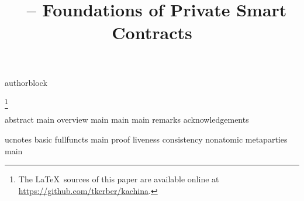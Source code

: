 \usepackage{packages}
\usepackage{contract}
\usepackage{notation}
\graphicspath{{fig/}}
\makeatletter
\newif\iffull\fulltrue
\makeatother
{authorblock}
\title{\kachina\ -- Foundations of Private Smart Contracts}


\maketitle
\todosum

\begingroup
\renewcommand\thefootnote{}%
\footnote{The \LaTeX\ sources of this paper are available online at \url{https://github.com/tkerber/kachina}.}%
\addtocounter{footnote}{-1}%
\endgroup
{abstract}
{main}
{overview}
{main}
{main}
{main}
{remarks}
{acknowledgements}

{}


\iffull
\startappendix
{ucnotes}
{basic}
{fullfuncts}
{main}
{proof}
{liveness}
{consistency}
{nonatomic}
{metaparties}
{main}
\fi



